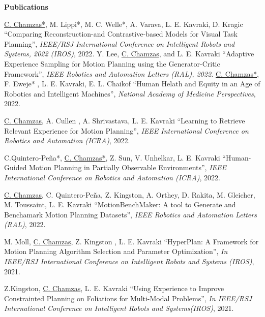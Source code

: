 \documentclass[letterpaper,11pt]{article}
\newcommand{\resheading}[1]{{\large \colorbox{mygrey}{\begin{minipage}{\textwidth}{\textbf{#1 \vphantom{p\^{E}}}}\end{minipage}}}}
\begin{document}
\resheading{Publications }
\begingroup
	\renewcommand{\section}[2]{}%
\begin{thebibliography}{14}
	\underline{C. Chamzas*}, M. Lippi*, M. C. Welle*, A. Varava, L. E. Kavraki, D. Kragic 
	``Comparing Reconstruction-and Contrastive-based Models for Visual Task Planning'',
	\textit{IEEE/RSJ International Conference on Intelligent Robots and Systems, 2022 (IROS)}, 2022.
	 Y. Lee, \underline{C. Chamzas}, and L. E. Kavraki 
	``Adaptive Experience Sampling for Motion Planning using the Generator-Critic Framework'',
	\textit{IEEE Robotics and Automation Letters (RAL), 2022.}
     \underline{C. Chamzas*}, F. Eweje* , L. E. Kavraki, E. L. Chaikof 
	``Human Helath and Equity in an Age of Robotics and Intelligent Machines'',
    \textit{National Academy of Medicine Perspectives}, 2022.

     \underline{C. Chamzas}, A. Cullen , A. Shrivastava, L. E. Kavraki
	``Learning to Retrieve Relevant Experience for Motion Planning'',
    \textit{IEEE International Conference on Robotics and Automation (ICRA)}, 2022.

     C.Quintero-Peña*, \underline{C. Chamzas*}, Z. Sun, V. Unhelkar, L. E. Kavraki
	``Human-Guided Motion Planning in Partially Observable Environments'',
    \textit{IEEE International Conference on Robotics and Automation (ICRA)}, 2022.

     \underline{C. Chamzas}, C. Quintero-Peña, Z. Kingston, A. Orthey, D. Rakita, M. Gleicher, M. Toussaint, L. E. Kavraki      ``MotionBenchMaker: A tool to Generate and Benchamark Motion Planning Datasets'',
     \textit{IEEE Robotics and Automation Letters (RAL)}, 2022.  

     M. Moll, \underline{C. Chamzas}, Z. Kingston , L. E. Kavraki
     ``HyperPlan: A Framework for Motion Planning Algorithm Selection and Parameter Optimization'',
     \textit{In IEEE/RSJ International Conference on Intelligent Robots and Systems (IROS)}, 2021.  

     Z.Kingston, \underline{C. Chamzas}, L. E. Kavraki
     ``Using Experience to Improve Constrainted Planning on Foliations for Multi-Modal Problems'',
     \textit{In IEEE/RSJ International Conference on Intelligent Robots and Systems(IROS)}, 2021.  


\end{thebibliography}
\end{document}
